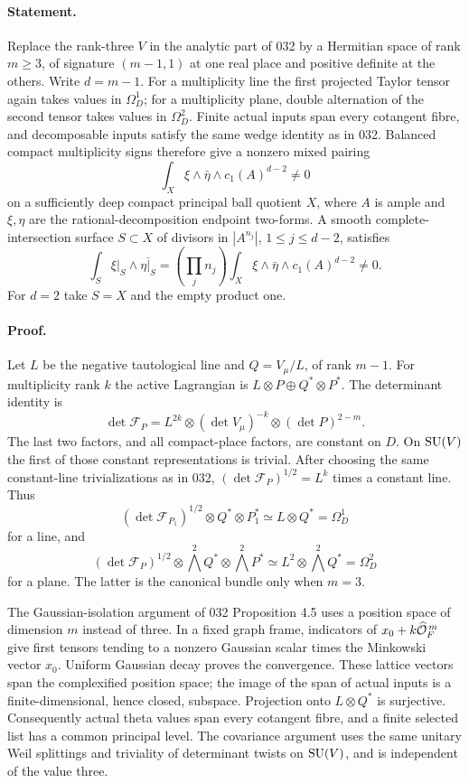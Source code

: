 \documentclass[11pt]{article}
\theoremstyle{definition}\newtheorem{definition}[theorem]{Definition}\newtheorem{remark}[theorem]{Remark}
\begin{document}
\paragraph{Statement.}
Replace the rank-three $V$ in the analytic part of 032 by a Hermitian
space of rank $m\geq3$, of signature $(m-1,1)$ at one real place and
positive definite at the others. Write $d=m-1$. For a multiplicity line
the first projected Taylor tensor again takes values in $\Omega_D^1$;
for a multiplicity plane, double alternation of the second tensor takes
values in $\Omega_D^2$. Finite actual inputs span every cotangent
fibre, and decomposable inputs satisfy the same wedge identity as in
032. Balanced compact multiplicity signs therefore give a nonzero
mixed pairing
\begin{equation}\label{A4-pair}
 \int_X\xi\wedge\bar\eta\wedge c_1(A)^{d-2}\ne0
\end{equation}
on a sufficiently deep compact principal ball quotient $X$, where
$A$ is ample and $\xi,\eta$ are the rational-decomposition endpoint
two-forms. A smooth complete-intersection surface $S\subset X$ of
divisors in $|A^{n_j}|$, $1\leq j\leq d-2$, satisfies
\[
 \int_S\xi|_S\wedge\overline{\eta|_S}
 =\left(\prod_jn_j\right)
      \int_X\xi\wedge\bar\eta\wedge c_1(A)^{d-2}\ne0.
\]
For $d=2$ take $S=X$ and the empty product one.

\paragraph{Proof.}
Let $L$ be the negative tautological line and $Q=V_\mu/L$, of rank
$m-1$. For multiplicity rank $k$ the active Lagrangian is
$L\otimes P\oplus Q^*\otimes P^*$. The determinant identity is
\[
 \det\mathcal F_P
 =L^{2k}\otimes(\det V_\mu)^{-k}\otimes(\det P)^{2-m}.
\]
The last two factors, and all compact-place factors, are constant on
$D$. On $\operatorname{SU}(V)$ the first of those constant representations is
trivial. After choosing the same constant-line trivializations as in
032, $(\det\mathcal F_P)^{1/2}=L^k$ times a constant line. Thus
\[
 (\det\mathcal F_{P_1})^{1/2}\otimes Q^*\otimes P_1^*
       \simeq L\otimes Q^*=\Omega_D^1
\]
for a line, and
\[
 (\det\mathcal F_P)^{1/2}\otimes
             \bigwedge^2Q^*\otimes\bigwedge^2P^*
       \simeq L^2\otimes\bigwedge^2Q^*=\Omega_D^2
\]
for a plane. The latter is the canonical bundle only when $m=3$.

The Gaussian-isolation argument of 032 Proposition 4.5 uses a position
space of dimension $m$ instead of three. In a fixed graph frame,
indicators of $x_0+k\widehat{\mathcal O}_F^{\,m}$ give first tensors tending
to a nonzero Gaussian scalar times the Minkowski vector $x_0$.
Uniform Gaussian decay proves the convergence. These lattice vectors
span the complexified position space; the image of the span of actual
inputs is a finite-dimensional, hence closed, subspace. Projection
onto $L\otimes Q^*$ is surjective. Consequently actual theta values
span every cotangent fibre, and a finite selected list has a common
principal level. The covariance argument uses the same unitary Weil
splittings and triviality of determinant twists on $\operatorname{SU}(V)$, and is
independent of the value three.
\end{document}
